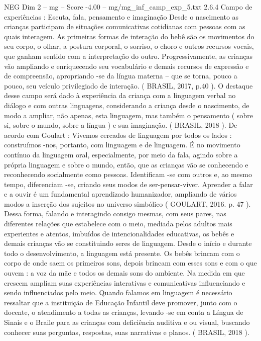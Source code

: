 \begin{textsample}{NEG Dim 2 – mg – Score -4.00 – mg/mg\_inf\_camp\_exp\_5.txt}  \label{ex:f2_neg_091}
2.6.4 Campo de experiências : Escuta, fala, pensamento e imaginação Desde o nascimento as crianças participam de situações comunicativas cotidianas com pessoas com as quais interagem.
As primeiras formas de interação do bebê são os movimentos do seu corpo, o olhar, a postura corporal, o sorriso, o choro e outros recursos vocais, que ganham sentido com a interpretação do outro.
Progressivamente, as crianças vão ampliando e enriquecendo seu vocabulário e demais recursos de expressão e de compreensão, apropriando -se da língua materna – que se torna, pouco a pouco, seu veículo privilegiado de interação. ( BRASIL, 2017, p.40 ).
O destaque desse campo será dado à experiência da criança com a linguagem verbal no diálogo e com outras linguagens, considerando a criança desde o nascimento, de modo a ampliar, não apenas, esta linguagem, mas também o pensamento ( sobre si, sobre o mundo, sobre a língua ) e sua imaginação. ( BRASIL, 2018 ).
De acordo com Goulart : Vivemos cercados de linguagem por todos os lados : construímos -nos, portanto, com linguagem e de linguagem.
É no movimento contínuo da linguagem oral, especialmente, por meio da fala, agindo sobre a própria linguagem e sobre o mundo, então, que as crianças vão se conhecendo e reconhecendo socialmente como pessoas.
Identificam -se com outros e, ao mesmo tempo, diferenciam -se, criando seus modos de ser-pensar-viver.
Aprender a falar e a ouvir é um fundamental aprendizado humanizador, ampliando de vários modos a inserção dos sujeitos no universo simbólico ( GOULART, 2016. p. 47 ).
Dessa forma, falando e interagindo consigo mesmas, com seus pares, nas diferentes relações que estabelece com o meio, mediada pelos adultos mais experientes e atentos, imbuídos de intencionalidades educativas, os bebês e demais crianças vão se constituindo seres de linguagem.
Desde o início e durante todo o desenvolvimento, a linguagem está presente.
Os bebês brincam com o corpo de onde saem os primeiros sons, depois brincam com esses sons e com o que ouvem : a voz da mãe e todos os demais sons do ambiente.
Na medida em que crescem ampliam suas experiências interativas e comunicativas influenciando e sendo influenciados pelo meio.
Quando falamos em linguagem é necessário ressaltar que a instituição de Educação Infantil deve promover, junto com o docente, o atendimento a todas as crianças, levando -se em conta a Língua de Sinais e o Braile para as crianças com deficiência auditiva e ou visual, buscando conhecer suas perguntas, respostas, suas narrativas e planos. ( BRASIL, 2018 ).

\end{textsample}
